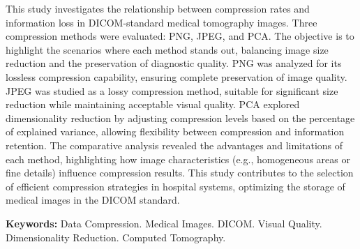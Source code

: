 This study investigates the relationship between compression rates and information loss in \acrshort{DICOM}-standard medical tomography images. Three compression methods were evaluated: \acrshort{PNG}, \acrshort{JPEG}, and \acrshort{PCA}. The objective is to highlight the scenarios where each method stands out, balancing image size reduction and the preservation of diagnostic quality. \acrshort{PNG} was analyzed for its lossless compression capability, ensuring complete preservation of image quality. \acrshort{JPEG} was studied as a lossy compression method, suitable for significant size reduction while maintaining acceptable visual quality. \acrshort{PCA} explored dimensionality reduction by adjusting compression levels based on the percentage of explained variance, allowing flexibility between compression and information retention. The comparative analysis revealed the advantages and limitations of each method, highlighting how image characteristics (e.g., homogeneous areas or fine details) influence compression results. This study contributes to the selection of efficient compression strategies in hospital systems, optimizing the storage of medical images in the \acrshort{DICOM} standard.

\textbf{Keywords:} Data Compression. Medical Images. \acrshort{DICOM}. Visual Quality. Dimensionality Reduction. Computed Tomography.
